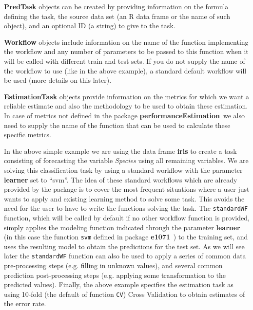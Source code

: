 \documentclass[10pt,a4paper]{article}\usepackage[]{graphicx}\usepackage[]{color}
\newcommand{\PE}{package \textbf{performanceEstimation}\ }
\begin{document}
\textbf{PredTask} objects can be created by providing information on the formula defining the task, the source data set (an R data frame or the name of such object), and an optional ID (a string) to give to the task.

\textbf{Workflow} objects include information on the name of the function implementing the workflow and any number of parameters to be passed to this function when it will be called with different train and test sets. If you do not supply the name of the workflow to use (like in the above example), a standard default workflow will be used (more details on this later).

\textbf{EstimationTask} objects provide information on the metrics for which we want a reliable estimate and also the methodology to be used to obtain these estimation. In case of metrics not defined in the \PE we also need to supply the name of the function that can be used to calculate these specific metrics.

In the above simple example we are using the data frame \textbf{iris} to create a task consisting of forecasting the variable \textit{Species} using all remaining variables. We are solving this classification task by using a standard workflow with the parameter \textbf{learner} set to ``svm''. The idea of these standard workflows which are already provided by the package is to cover the most frequent situations where a user just wants to apply and existing learning method to solve some task. This avoids the need for the user to have to write the functions solving the task. The \texttt{standardWF} function, which will be called by default if no other workflow function is provided, simply applies the modeling function indicated through the parameter \textbf{learner} (in this case the function \texttt{svm} defined in package \textbf{e1071}~\cite{e1071}) to the training set, and uses the resulting model to obtain the predictions for the test set. As we will see later the \texttt{standardWF} function can also be used to apply a series of common data pre-processing steps (e.g. filling in unknown values), and several common prediction post-processing steps (e.g. applying some transformation to the predicted values). Finally, the above example specifies the estimation task as using 10-fold (the default of function \texttt{CV}) Cross Validation to obtain estimates of the error rate. 



\end{document}
